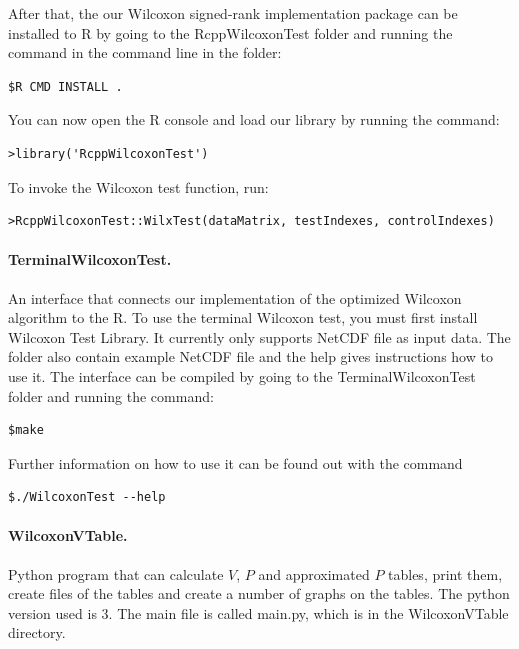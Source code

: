 \documentclass[12pt]{article}
\begin{document}
{After that, the our Wilcoxon signed-rank implementation package can be installed to R by going to the RcppWilcoxonTest folder and running the command in the command line in the folder:

\begin{lstlisting}
$R CMD INSTALL .
\end{lstlisting}

You can now open the R console and load our library by running the command:

\begin{lstlisting}
>library('RcppWilcoxonTest')
\end{lstlisting}

To invoke the Wilcoxon test function, run:

\begin{lstlisting}
>RcppWilcoxonTest::WilxTest(dataMatrix, testIndexes, controlIndexes)
\end{lstlisting}

\paragraph{TerminalWilcoxonTest.}

An interface that connects our implementation of the optimized Wilcoxon algorithm to the R. To use the terminal Wilcoxon test, you must first install Wilcoxon Test Library. It currently only supports NetCDF file as input data. The folder also contain example NetCDF file and the help gives instructions how to use it. The interface can be compiled by going to the TerminalWilcoxonTest folder and running the command:
\begin{lstlisting}
$make
\end{lstlisting}

Further information on how to use it can be found out with the command
\begin{lstlisting}
$./WilcoxonTest --help
\end{lstlisting}

\paragraph{WilcoxonVTable.}
Python program that can calculate $V$, $P$ and approximated $P$ tables, print them, create files of the tables and create a number of graphs on the tables. The python version used is 3. The main file is called main.py, which is in the WilcoxonVTable directory.

}
\end{document}
